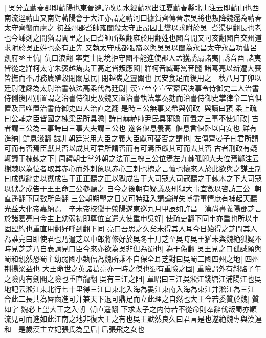 |{
	吳分立蘄春郡即蘄陽也東晉避諱改焉水經蘄水出江夏蘄春縣北山注云即蘄山也西南流逕蘄山又南對蘄陽會于大江亦謂之蘄河口據賀齊傳晉宗吳將也叛降魏還為蘄春太守齊襲而虜之}
初益州郡耆帥雍闓殺太守正昂因士燮以求附於吳|{
	耆渠伊翻長也老也今嵊剡之間猶謂閭里之長曰耆帥所類翻雍於用翻姓也闓音開又可亥翻闓自交州道求附於吳正姓也秦有正先}
又執太守成都張裔以與吳吳以闓為永昌太守永昌功曹呂凱府丞王伉|{
	伉口浪翻}
率吏士閉境拒守闓不能進使郡人孟獲誘扇諸夷|{
	誘音酉}
諸夷皆從之牂柯太守朱褒越雋夷王高定皆叛應闓|{
	牂柯音臧哥嶲音髓}
諸葛亮以新遭大喪皆撫而不討務農殖穀閉關息民|{
	閉越嶲之靈關也}
民安食足而後用之　秋八月丁卯以廷尉鍾繇為太尉治書執法高柔代為廷尉|{
	漢宣帝幸宣室齋居决事令侍御史二人治書侍側後因别置謂之治書侍御史及魏又置治書執法掌奏劾而治書侍御史掌律令二官俱置及晉唯置治書侍御史四人治直之翻}
是時三公無事又希與朝政|{
	與讀曰預}
柔上疏曰公輔之臣皆國之棟梁民所具瞻|{
	詩曰赫赫師尹民具爾瞻}
而置之三事不使知政|{
	古者謂三公為三事詩曰三事大夫謂三公也}
遂各偃息養高|{
	偃息言偃卧以自安也}
鮮有進納|{
	鮮息淺翻}
誠非朝廷崇用大臣之義大臣獻可替否之謂也|{
	左傳齊晏子曰君所謂可而有否焉臣獻其否以成其可君所謂否而有可焉臣獻其可而去其否}
古者刑政有疑輒議于槐棘之下|{
	周禮朝士掌外朝之法而三槐三公位焉左九棘孤卿大夫位焉鄭注云樹棘以為位者取其赤心而外刺象以赤心三刺也槐之言懷也懷來人於此欲與之謀王制曰成獄辭史以獄成告于正正聽之正以獄成告于大司寇大司寇聽之于棘木之下大司寇以獄之成告于王王命三公參聽之}
自今之後朝有疑議及刑獄大事宜數以咨訪三公|{
	朝直遥翻下同數所角翻}
三公朝朔朢之日又可特延入講論得失博盡事情庶有補起天聽光益大化帝嘉納焉　辛未帝校獵于滎陽遂東巡九月甲辰如許昌　漢尚書義陽鄧芝言於諸葛亮曰今主上幼弱初即尊位宜遣大使重申吳好|{
	使疏吏翻下同申亦重也所以申固盟約也重直用翻好呼到翻下同}
亮曰吾思之久矣未得其人耳今日始得之芝問其人為誰亮曰即使君也乃遣芝以中郎將修好於吳冬十月芝至吳時吳王猶未與魏絶狐疑不時見芝芝乃自表請見曰臣今來亦欲為吳非但為蜀也|{
	為于偽翻}
吳王見之曰孤誠願與蜀和親然恐蜀主幼弱國小埶偪為魏所乘不自保全耳芝對曰吳蜀二國四州之地|{
	四州荆揚梁益也}
大王命世之英諸葛亮亦一時之傑也蜀有重險之固|{
	重險謂外有斜駱子午之險内有劍閣之險也重直龍翻}
吳有三江之阻|{
	韋昭曰三江吳淞江錢塘江浦陽江也吳地記云淞江東北行七十里得三江口東北入海為婁江東南入海為東江并淞江為三江}
合此二長共為唇齒進可并兼天下退可鼎足而立此理之自然也大王今若委質於魏|{
	質如字}
魏必上望大王之入朝|{
	朝直遥翻}
下求太子之内侍若不從命則奉辭伐叛蜀亦順流見可而進如此江南之地非復大王之有也吳王默然良久曰君言是也遂絶魏專與漢連和　是歲漢主立妃張氏為皇后|{
	后張飛之女也}


